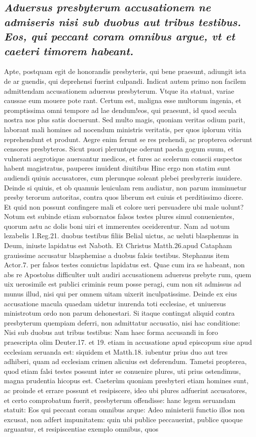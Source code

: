 \documentclass{article}
\begin{document}
\begin{pages}
\subsection*{\textit{Aduersus presbyterum accusationem ne admiseris nisi sub duobus aut tribus testibus. Eos, qui peccant coram omnibus argue, vt et caeteri timorem habeant. }}\pstart Apte, postquam egit de honorandis presbyteris, qui bene praesunt, adiungit ista de ar guendis, qui deprehensi fuerint culpandi. Indicat autem primo non facilem admittendam accusationem aduersus presbyterum. Vtque ita statuat, variae caussae eum mouere pote rant. Certum est, maligna esse multorum ingenia, et promptissima omni tempore ad lae dendum!eos, qui praesunt, id quod secula nostra nos plus satis docuerunt. Sed multo magis, quoniam veritas odium parit, laborant mali homines ad nocendum ministris veritatis, per quos iplorum vitia reprehendunt et produnt. Aegre enim ferunt se res prehendi, ac propterea oderunt censores presbyteros. Sicut puori pleruntque oderunt paeda gogum suum, et vulnerati aegrotique auersantur medicos, et fures ac scelerum conscii suspectos habent magistratus, pauperes inuident diuitibus Hinc ergo non statim sunt audiendi quiuis accusatores, cum plerunque soleant plebei presbyreris inuidere. Deinde si quiuis, et ob quamuis leuiculam rem audiatur, non parum imminuetur presby terorum autoritas, contra quos liberum est cuiuis et perditissimo dicere. Et quid non possunt confingere mali et colore ueri persuadere ubi male uolunt? Notum est subinde etiam subornatos falsos testes plures simul conuenientes, quorum astu ac dolis boni uiri et immerentes oceiderentur. Nam ad uotum lezabelis 1.Reg.21. duobus testibus filiis Belial uictus, ac ueluti blasphemus in Deum, iniuste lapidatus est Naboth. Et Christus Matth.26.apud Catapham grauissime accusatur blasphemiae a duobus falsis testibus. Stephanus item Actor.7. per falsos testes conuictus lapidatus est. Quae cum ira se habeant, non abs re Apostolus difficulter uult audiri accusationem aduersus prebyte rum, quem uix uerosimile est publici criminis reum posse peragi, cum non sit admissus ad munus illud, nisi qui per omnem uitam uixerit inculpatissime. Deinde ex eius accusatione macula quaedam uidetur inurenda toti ecclesiae, et uniuersus ministrotum ordo non parum dehonestari. Si itaque contingat aliquid contra presbyterum quempiam deferri, non admittatur accusatio, nisi hac conditione: Nisi sub duobus aut tribus testibus: Nam haec forma accusandi in foro praescripta olim Deuter.17. et 19. etiam in accusatione apud episcopum siue apud ecclesiam seruanda est: siquidem et Matth.18. iubentur prius duo aut tres adhiberi, quam ad ecclesiam crimen alicuius est deferendum. Tametsi propterea, quod etiam falsi testes possunt inter se conuenire plures, uti prius ostendimus, magna prudentia hicopus est.  \pend\pstart Caeterùm quoniam presbyteri etiam homines sunt, ac proinde et errare possunt et resipiscere, ideo ubi plures adfuerint accusatores, et certo comprobatum fuerit, presbyterum offendisse: hanc legem seruandam statuit: Eos qui peccant coram omnibus arque: Adeo ministerii functio illos non excusat, non adfert impunitatem: quin ubi publice peccauerint, publice quoque arguantur, et resipiscentiae exemplo omnibus, quos 
\end{pages}
\end{document}
